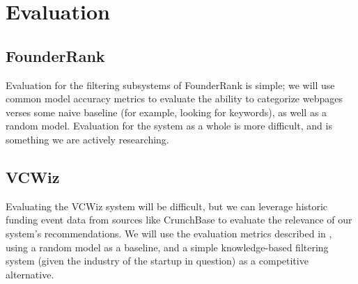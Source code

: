 \section{Evaluation}

\subsection{FounderRank}

Evaluation for the filtering subsystems of FounderRank is simple; we will use common model accuracy metrics to evaluate the ability to categorize webpages verses some naive baseline (for example, looking for keywords), as well as a random model. Evaluation for the system as a whole is more difficult, and is something we are actively researching.

\subsection{VCWiz}

Evaluating the VCWiz system will be difficult, but we can leverage historic funding event data from sources like CrunchBase to evaluate the relevance of our system's recommendations. We will use the evaluation metrics described in \cite{stone2014computational}, using a random model as a baseline, and a simple knowledge-based filtering system (given the industry of the startup in question) as a competitive alternative.
